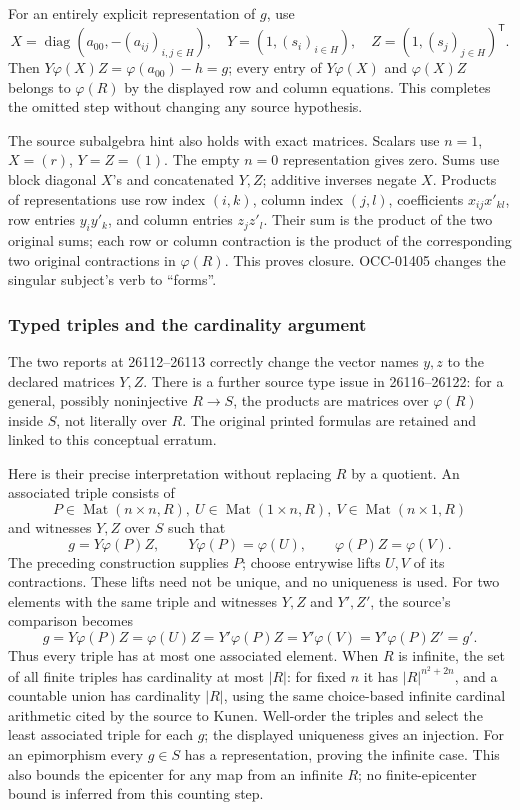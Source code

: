 For an entirely explicit representation of \(g\), use \[
X=\operatorname{diag}(a_{00},-(a_{ij})_{i,j\in H}),\quad
Y=(1,(s_i)_{i\in H}),\quad Z=(1,(s_j)_{j\in H})^{\mathsf T}.
\] Then \(Y\varphi(X)Z=\varphi(a_{00})-h=g\); every entry of \(Y\varphi(X)\) and \(\varphi(X)Z\) belongs to \(\varphi(R)\) by the displayed row and column equations. This completes the omitted step without changing any source hypothesis.

The source subalgebra hint also holds with exact matrices. Scalars use \(n=1\), \(X=(r)\), \(Y=Z=(1)\). The empty \(n=0\) representation gives zero. Sums use block diagonal \(X\)'s and concatenated \(Y,Z\); additive inverses negate \(X\). Products of representations use row index \((i,k)\), column index \((j,l)\), coefficients \(x_{ij}x'_{kl}\), row entries \(y_i y'_k\), and column entries \(z_j z'_l\). Their sum is the product of the two original sums; each row or column contraction is the product of the corresponding two original contractions in \(\varphi(R)\). This proves closure. OCC-01405 changes the singular subject's verb to ``forms''.

\subsubsection{Typed triples and the cardinality argument}\label{algebra-proof-021-typed-triples-and-the-cardinality-argument}

The two reports at 26112--26113 correctly change the vector names \(y,z\) to the declared matrices \(Y,Z\). There is a further source type issue in 26116--26122: for a general, possibly noninjective \(R\to S\), the products are matrices over \(\varphi(R)\) inside \(S\), not literally over \(R\). The original printed formulas are retained and linked to this conceptual erratum.

Here is their precise interpretation without replacing \(R\) by a quotient. An associated triple consists of \[
P\in\operatorname{Mat}(n\times n,R),\
U\in\operatorname{Mat}(1\times n,R),\
V\in\operatorname{Mat}(n\times1,R)
\] and witnesses \(Y,Z\) over \(S\) such that \[
g=Y\varphi(P)Z,\qquad
Y\varphi(P)=\varphi(U),\qquad
\varphi(P)Z=\varphi(V).
\] The preceding construction supplies \(P\); choose entrywise lifts \(U,V\) of its contractions. These lifts need not be unique, and no uniqueness is used. For two elements with the same triple and witnesses \(Y,Z\) and \(Y',Z'\), the source's comparison becomes \[
g=Y\varphi(P)Z=\varphi(U)Z
=Y'\varphi(P)Z=Y'\varphi(V)
=Y'\varphi(P)Z'=g'.
\] Thus every triple has at most one associated element. When \(R\) is infinite, the set of all finite triples has cardinality at most \(|R|\): for fixed \(n\) it has \(|R|^{n^2+2n}\), and a countable union has cardinality \(|R|\), using the same choice-based infinite cardinal arithmetic cited by the source to Kunen. Well-order the triples and select the least associated triple for each \(g\); the displayed uniqueness gives an injection. For an epimorphism every \(g\in S\) has a representation, proving the infinite case. This also bounds the epicenter for any map from an infinite \(R\); no finite-epicenter bound is inferred from this counting step.

